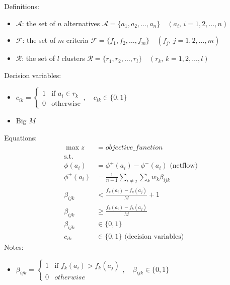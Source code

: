 \documentclass[a4paper]{article}
\begin{document}
    Definitions:
    \begin{itemize}
        \item $\mathcal{A}$: the set of $n$ alternatives $\mathcal{A} = \{a_1, a_2, \dots, a_n\} \quad (a_i,\, i = 1, 2, \dots, n)$
        \item $\mathcal{F}$: the set of $m$ criteria $\mathcal{F} = \{f_1, f_2, \dots, f_m\} \quad (f_j,\, j = 1, 2, \dots, m)$
        \item $\mathcal{R}$: the set of $l$ clusters $\mathcal{R} = \{r_1, r_2, \dots, r_l\} \quad (r_k,\, k = 1, 2, \dots, l)$
    \end{itemize}
    Decision variables:
    \begin{itemize}
        \item $c_{ik} = \begin{cases}
            1 & \text{if } a_i \in r_k \\
            0 & \text{otherwise}
        \end{cases}, \quad c_{ik} \in \{0, 1\}$
        \item Big $M$
    \end{itemize}
    Equations:
    \begin{align*}
        \max z &= objective\_function\\
        \text{s.t.} & \\
        \phi(a_i) &= \phi^+(a_i) - \phi^-(a_i) \text{ (netflow)} \\
        \phi^+(a_i) &= \frac{1}{n-1} \sum_{i \neq j}^{} \sum_{k}{} w_k \beta_{ijk} \\
        \beta_{ijk} &< \frac{f_k(a_i)-f_k(a_j)}{M} + 1 \\
        \beta_{ijk} &\geq \frac{f_k(a_i)-f_k(a_j)}{M} \\
        \beta_{ijk} &\in \{0,1\}\\
        c_{ik} &\in \{0, 1\} \text{ (decision variables)}
    \end{align*}
    Notes:
    \begin{itemize}
        \item $\beta_{ijk} = \begin{cases}
            1 & \text{if } f_k(a_i) > f_k(a_j) \\
            0 & otherwise
        \end{cases}, \quad \beta_{ijk} \in \{0, 1\}$
    \end{itemize}
\end{document}
